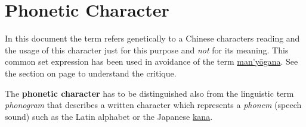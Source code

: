 \section{Phonetic Character}
\label{sec:PhoneticCharacter}

In this document the term  refers
genetically to a Chinese characters reading and the usage of this character
just for this purpose and \textit{not} for its meaning. This common set
expression has been used in avoidance of the term
\hyperref[sec:Manyogana]{man'yōgana}. See the section 
on page \pageref{sec:Manyogana} to understand the critique.

The \textbf{phonetic character} has to be distinguished also from the
linguistic term \textit{phonogram} that describes a written character which
represents a \textit{phonem} (speech sound) such as the Latin alphabet or the
Japanese \hyperref[sec:Kana]{kana}.


